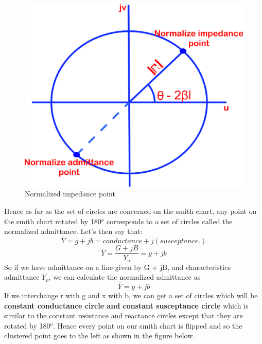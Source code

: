 \begin{figure}[h]
\centering
\includegraphics[width=0.6\linewidth]{./graphics/zstyuiou}
\caption{Normalized impedance point}
\label{fig:zstyuiou}
\end{figure}

Hence as far as the set of circles are concerned on the smith chart, any point on the smith chart rotated by 180$^o$ corresponds to a set of circles called the normalized admittance. Let's then say that:
\begin{equation*}
\overline{Y} = g + jb = conductance + j(susceptance.)
\end{equation*}
\begin{equation*}
\overline{Y}=\frac{G + jB}{Y_o} = g + jb
\end{equation*}
So if we have admittance on a line given by G + jB, and characteristics admittance $Y_o$, we can calculate the normalized admittance as 
\begin{equation*}
\overline{Y} = g + jb
\end{equation*}
If we interchange r with g and x with b, we can get a set of circles which will be \textbf{constant conductance circle and constant susceptance circle} which is similar to the constant resistance and reactance circles except that they are rotated by 180$^o$. Hence every point on our smith chart is flipped and so the clustered point goes to the left as shown in the figure below.

